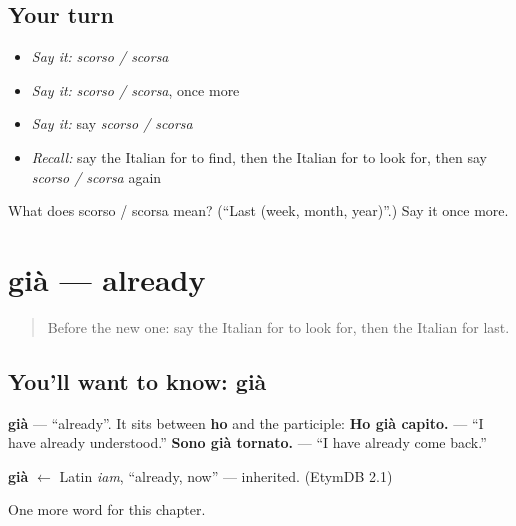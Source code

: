 \subsection*{Your turn}
\begin{itemize}
\raggedright
  \item \emph{Say it:} \emph{scorso / scorsa}
  \item \emph{Say it:} \emph{scorso / scorsa}, once more
  \item \emph{Say it:} say \emph{scorso / scorsa}
  \item \emph{Recall:} say the Italian for to find, then the Italian for to look for, then say \emph{scorso / scorsa} again
\end{itemize}

\begin{tcolorbox}[breakable,colback=teal!4,colframe=teal!35!black,title={Before you move on}]
What does scorso / scorsa mean? (\textquotedblleft{}Last (week, month, year)\textquotedblright{}.) Say it once more.
\end{tcolorbox}
\section[già]{già — already}

\label{lesson:IT-C137-gia}



\begin{quote}
Before the new one: say the Italian for to look for, then the Italian for last.
\end{quote}

\subsection*{You'll want to know: già}
\textbf{già} — \textquotedblleft{}already\textquotedblright{}. It sits between \textbf{ho} and the participle: \textbf{Ho già capito.} — \textquotedblleft{}I have already understood.\textquotedblright{} \textbf{Sono già tornato.} — \textquotedblleft{}I have already come back.\textquotedblright{}

\begin{cousinweb}
\textbf{già} $\leftarrow$ Latin \emph{iam}, \textquotedblleft{}already, now\textquotedblright{} — inherited. (EtymDB 2.1)
\end{cousinweb}

\begin{grammarlens}[title={What you've built}]
One more word for this chapter.
\end{grammarlens}


